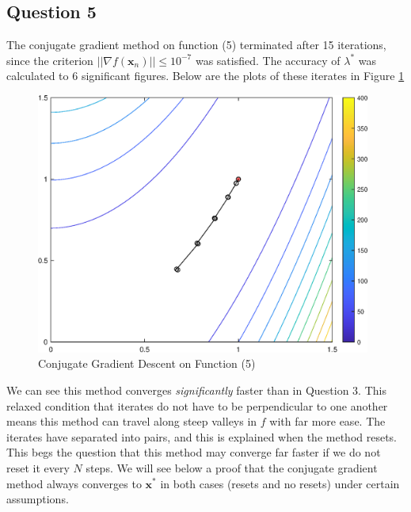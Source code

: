 \documentclass[10pt,a4paper,notitlepage]{article}
\newcommand{\abs}[1]{\lvert#1\rvert}
\newcommand{\x}{\mathbf{x}}
\begin{document}
\subsection*{\centering Question 5}\label{sc:5}
The conjugate gradient method on function (5) terminated after 15 iterations, since the criterion $\abs{\abs{\nabla f(\x_{n})}}\leq 10^{-7}$ was satisfied. The accuracy of $\lambda^{*}$ was calculated to 6 significant figures. Below are the plots of these iterates in Figure \ref{fg:Blah}
\begin{figure}[H]
\centering
\includegraphics[width=11cm]{Image_6}
\caption{Conjugate Gradient Descent on Function (5)}\label{fg:Blah}
\end{figure}
We can see this method converges \textit{significantly} faster than in Question 3. This relaxed condition that iterates do not have to be perpendicular to one another means this method can travel along steep valleys in $f$ with far more ease. The iterates have separated into pairs, and this is explained when the method resets. This begs the question that this method may converge far faster if we do not reset it every $N$ steps. We will see below a proof that the conjugate gradient method always converges to $\x^{*}$ in both cases (resets and no resets) under certain assumptions.
\end{document}
